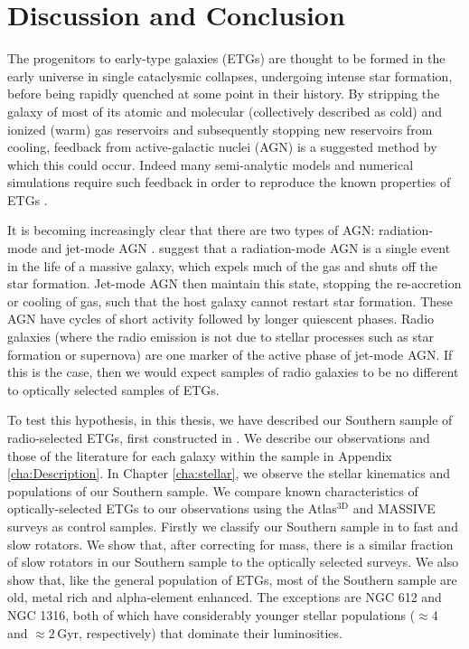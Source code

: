 \chapter{Discussion and Conclusion}
	\label{cha:conclusion}
The progenitors to early-type galaxies (ETGs) are thought to be formed in the early universe in single cataclysmic collapses, undergoing intense star formation, before being rapidly quenched at some point in their history. By stripping the galaxy of most of its atomic and molecular (collectively described as cold) and ionized (warm) gas reservoirs and subsequently stopping new reservoirs from cooling, feedback from active-galactic nuclei (AGN) is a suggested method by which this could occur. Indeed many semi-analytic models and numerical simulations require such feedback in order to reproduce the known properties of ETGs \citep[e.g.][]{Kauffmann2000, DiMatteo2005, Springel2005, Bower2006}. 

It is becoming increasingly clear that there are two types of AGN: radiation-mode and jet-mode AGN \citep[e.g.][]{Antonucci2012}. \citet{Heckman2014} suggest that a radiation-mode AGN is a single event in the life of a massive galaxy, which expels much of the gas and shuts off the star formation. Jet-mode AGN then maintain this state, stopping the re-accretion or cooling of gas, such that the host galaxy cannot restart star formation. These AGN have cycles of short activity followed by longer quiescent phases. Radio galaxies (where the radio emission is not due to stellar processes such as star formation or supernova) are one marker of the active phase of jet-mode AGN. If this is the case, then we would expect samples of radio galaxies to be no different to optically selected samples of ETGs. 

To test this hypothesis, in this thesis, we have described our Southern sample of radio-selected ETGs, first constructed in \citet{Prandoni2010}. We describe our observations and those of the literature for each galaxy within the sample in Appendix \ref{cha:Description}. In Chapter \ref{cha:stellar}, we observe the stellar kinematics and populations of our Southern sample. We compare known characteristics of optically-selected ETGs to our observations using the Atlas$^\text{3D}$ and MASSIVE surveys as control samples. Firstly we classify our Southern sample in to fast and slow rotators. We show that, after correcting for mass, there is a similar fraction of slow rotators in our Southern sample to the optically selected surveys. We also show that, like the general population of ETGs, most of the Southern sample are old, metal rich and alpha-element enhanced. The exceptions are NGC 612 and NGC 1316, both of which have considerably younger stellar populations ($\approx 4$ and $\approx 2$\,Gyr, respectively) that dominate their luminosities. 

